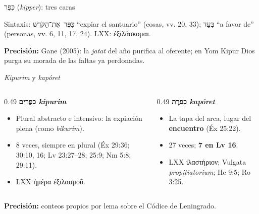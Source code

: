 \documentclass[hyperref={bookmarks=false},aspectratio=169]{beamer}
\newcommand{\heb}[1]{\mbox{\foreignlanguage{hebrew}{#1}}}
\newcommand{\grc}[1]{\foreignlanguage{ancientgreek}{#1}}
\newcommand{\destacar}[1]{\textbf{\textcolor{tierraroja}{#1}}}
\newcommand{\precision}[1]{{\footnotesize\color{sepia}\textbf{Precisión:} #1}}
\begin{document}
\begin{frame}{\heb{כִּפֶּר} (\emph{kipper}): tres caras}
\centering
{}\par\medskip
\scriptsize\RaggedRight Sintaxis: \heb{כִּפֶּר אֶת־הַקֹּדֶשׁ} ``expiar el santuario'' (cosas, vv. 20, 33); \heb{בְּעַד} ``a favor de'' (personas, vv. 6, 11, 17, 24). LXX: \grc{ἐξιλάσκομαι}.\par
\precision{Gane (2005): la \emph{jatat} del año purifica al oferente; en Yom Kipur Dios purga su morada de las faltas ya perdonadas.}
\end{frame}

\begin{frame}{\emph{Kipurim} y \emph{kapóret}}
\begin{columns}[t,onlytextwidth]
\begin{column}{0.49\textwidth}\small
\destacar{\heb{כִּפֻּרִים} \emph{kipurim}}
\begin{itemize}
\item Plural abstracto e intensivo: la expiación plena (como \emph{bikurim}).
\item 8 veces, siempre en plural (Éx 29:36; 30:10, 16; Lv 23:27--28; 25:9; Nm 5:8; 29:11).
\item LXX \grc{ἡμέρα ἐξιλασμοῦ}.
\end{itemize}
\end{column}
\begin{column}{0.49\textwidth}\small
\destacar{\heb{כַּפֹּרֶת} \emph{kapóret}}
\begin{itemize}
\item La tapa del arca, lugar del \destacar{encuentro} (Éx 25:22).
\item 27 veces; \destacar{7 en Lv 16}.
\item LXX \grc{ἱλαστήριον}; Vulgata \emph{propitiatorium}; He 9:5; Ro 3:25.
\end{itemize}
\end{column}
\end{columns}\par\medskip
\precision{conteos propios por lema sobre el Códice de Leningrado.}
\end{frame}
\end{document}
